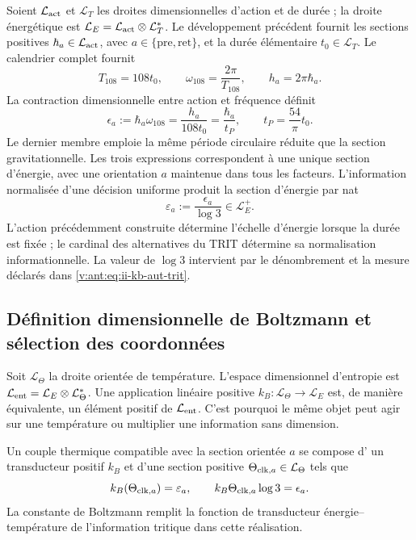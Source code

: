 Soient \(\mathcal L_{\rm act}\) et \(\mathcal L_T\) les droites
dimensionnelles d'action et de durée ; la droite énergétique est
\(\mathcal L_E=\mathcal L_{\rm act}\otimes\mathcal L_T^*\).
Le développement précédent fournit les sections positives
\(\hbar_a\in\mathcal L_{\rm act}\), avec
\(a\in\{\mathrm{pre},\mathrm{ret}\}\), et la durée élémentaire
\(t_0\in\mathcal L_T\). Le calendrier complet fournit
\[
 T_{108}=108t_0,\qquad
 \omega_{108}=\frac{2\pi}{T_{108}},\qquad
 h_a=2\pi\hbar_a.
\]
La contraction dimensionnelle entre action et fréquence définit
\begin{equation}
 \epsilon_a:=\hbar_a\omega_{108}
 =\frac{h_a}{108t_0}
 =\frac{\hbar_a}{t_P},\qquad
 t_P=\frac{54}{\pi}t_0.
 \label{v:ant:eq:ii-kb-aut-energia}
\end{equation}
Le dernier membre emploie la même période circulaire réduite que la section gravitationnelle. Les trois expressions correspondent à une unique section d'énergie, avec une orientation \(a\) maintenue dans tous les facteurs. L'information normalisée d'une décision uniforme produit la section d'énergie par nat
\begin{equation}
 \varepsilon_a:=\frac{\epsilon_a}{\log3}\in\mathcal L_E^+.
 \label{v:ant:eq:ii-kb-aut-energia-nat}
\end{equation}
L'action précédemment construite détermine l'échelle d'énergie lorsque
la durée est fixée ; le cardinal des alternatives du TRIT détermine sa
normalisation informationnelle. La valeur de \(\log3\) intervient par le
dénombrement et la mesure déclarés dans \eqref{v:ant:eq:ii-kb-aut-trit}.

\subsection{Définition dimensionnelle de Boltzmann et sélection des coordonnées}

Soit \(\mathcal L_\Theta\) la droite orientée de température. L'espace dimensionnel d'entropie est \(\mathcal L_{\rm ent}=\mathcal L_E\otimes\mathcal L_\Theta^*\). Une application linéaire positive \(k_B:\mathcal L_\Theta\to\mathcal L_E\) est, de manière équivalente, un élément positif de \(\mathcal L_{\rm ent}\). C'est pourquoi le même objet peut agir sur une température ou multiplier une information sans dimension.

\begin{definition}
Un couple thermique compatible avec la section orientée \(a\) se compose d'
un transducteur positif \(k_B\) et d'une section positive
\(\Theta_{{\rm clk},a}\in\mathcal L_\Theta\) tels que
\begin{equation}
 k_B(\Theta_{{\rm clk},a})=\varepsilon_a,
 \qquad
 k_B\Theta_{{\rm clk},a}\log3=\epsilon_a.
 \label{v:ant:eq:ii-kb-aut-par-termico}
\end{equation}
La constante de Boltzmann remplit la fonction de transducteur
énergie--température de l'information tritique dans cette réalisation.
\end{definition}


